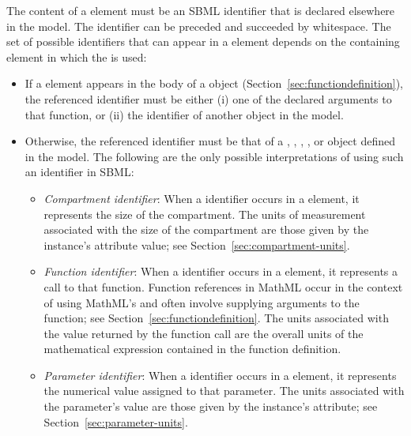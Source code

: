 The content of a  element must be an SBML identifier
that is declared elsewhere in the model.  The identifier can be
preceded and succeeded by whitespace. The set of possible
identifiers that can appear in a  element depends on the
containing element in which the  is used:
\begin{itemize}
  
\item If a  element appears in the body of a
  \FunctionDefinition object
  (Section~\ref{sec:functiondefinition}), the referenced
  identifier must be either (i) one of the declared arguments to
  that function, or (ii) the identifier of another
  \FunctionDefinition object in the model.
  
\item Otherwise, the referenced identifier must be that of a
  \Compartment, \FunctionDefinition, \Parameter, \Reaction,
  \Species or \SpeciesReference object defined in the model.  The
  following are the only possible interpretations of using such an
  identifier in SBML:
  \begin{itemize}

  \item \emph{Compartment identifier}: When a \Compartment
    identifier occurs in a  element, it represents the
    size of the compartment.  The units of measurement
      associated with the size of the compartment are those given
      by the \Compartment instance's  attribute
      value; see Section~\ref{sec:compartment-units}.
    
  \item \emph{Function identifier}: When a \FunctionDefinition
    identifier occurs in a  element, it represents a
    call to that function.  Function references in MathML occur in
    the context of using MathML's  and often involve
    supplying arguments to the function; see
    Section~\ref{sec:functiondefinition}.  The units
      associated with the value returned by the function
      call are the overall units of the mathematical expression
    contained in the function definition.
    
  \item \emph{Parameter identifier}: When a \Parameter identifier
    occurs in a  element, it represents the numerical
    value assigned to that parameter.  The units
      associated with the parameter's value are those given by the
      \Parameter instance's  attribute; see
    Section~\ref{sec:parameter-units}.


\end{itemize}
\end{itemize}

